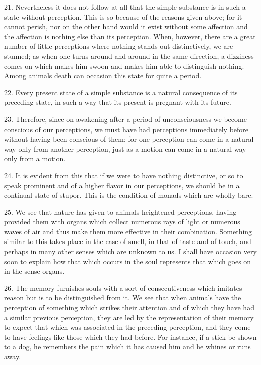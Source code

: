 21. Nevertheless it does not follow at all that the simple substance
is in such a state without perception. This is so because of the
reasons given above; for it cannot perish, nor on the other hand would
it exist without some affection and the affection is nothing else than
its perception. When, however, there are a great number of little
perceptions where nothing stands out distinctively, we are stunned; as
when one turns around and around in the same direction, a dizziness
comes on which makes him swoon and makes him able to distinguish
nothing. Among animals death can occasion this state for quite a
period.

22. Every present state of a simple substance is a natural consequence
of its preceding state, in such a way that its present is pregnant
with its future.

23. Therefore, since on awakening after a period of 
unconsciousness we become conscious of our perceptions, we must have
had perceptions immediately before without having been conscious of
them; for one perception can come in a natural way only from another
perception, just as a motion can come in a natural way only from a
motion.

24. It is evident from this that if we were to have nothing
distinctive, or so to speak prominent and of a higher flavor in our
perceptions, we should be in a continual state of stupor. This is the
condition of monads which are wholly bare.

25. We see that nature has given to animals heightened perceptions,
having provided them with organs which collect numerous rays of light
or numerous waves of air and thus make them more effective in their
combination. Something similar to this takes place in the case of
smell, in that of taste and of touch, and perhaps in many other senses
which are unknown to us. I shall have occasion very soon to explain
how that which occurs in the soul represents that which goes on in the
sense-organs.

26. The memory furnishes souls with a sort of consecutiveness which
imitates reason but is to be distinguished from it. We see that when
animals have the perception of something which strikes their attention
and of which they have had a similar previous perception, they are led
by the representation of their memory to expect that which was
associated in the preceding perception, and they come to have feelings
like those which they had before. For instance, if a stick be shown to
a dog, he remembers the pain which it has caused him and he whines or
runs away.

